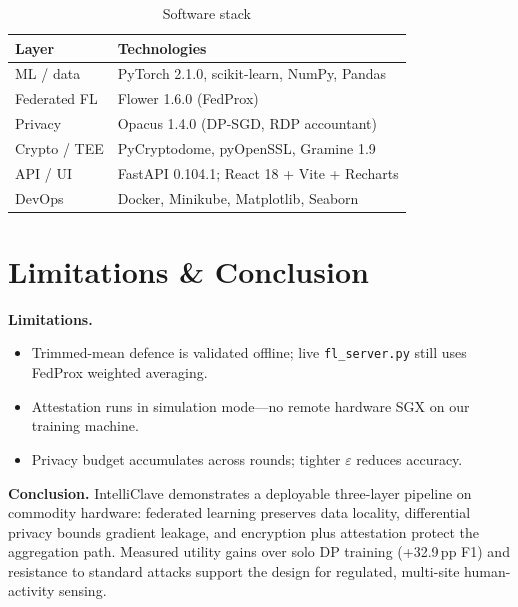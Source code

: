 \documentclass[10pt,a4paper,twocolumn]{article}
\begin{document}
\begin{table}[h!]
\centering
\caption{Software stack}
\small
{}
\begin{tabular}{@{}p{2cm}p{4.9cm}@{}}
\toprule
\textbf{Layer} & \textbf{Technologies} \\
\midrule
ML / data & PyTorch 2.1.0, scikit-learn, NumPy, Pandas \\
Federated FL & Flower 1.6.0 (FedProx) \\
Privacy & Opacus 1.4.0 (DP-SGD, RDP accountant) \\
Crypto / TEE & PyCryptodome, pyOpenSSL, Gramine 1.9 \\
API / UI & FastAPI 0.104.1; React 18 + Vite + Recharts \\
DevOps & Docker, Minikube, Matplotlib, Seaborn \\
\bottomrule
\end{tabular}
\end{table}

\section{Limitations \& Conclusion}

\textbf{Limitations.}
\begin{itemize}
  \item Trimmed-mean defence is validated offline; live \texttt{fl\_server.py} still uses FedProx weighted averaging.
  \item Attestation runs in simulation mode---no remote hardware SGX on our training machine.
  \item Privacy budget accumulates across rounds; tighter $\varepsilon$ reduces accuracy.
\end{itemize}

\textbf{Conclusion.}
IntelliClave demonstrates a deployable three-layer pipeline on commodity hardware: federated learning preserves data locality, differential privacy bounds gradient leakage, and encryption plus attestation protect the aggregation path. Measured utility gains over solo DP training (+32.9\,pp F1) and resistance to standard attacks support the design for regulated, multi-site human-activity sensing.

\vspace{2pt}
\end{document}
